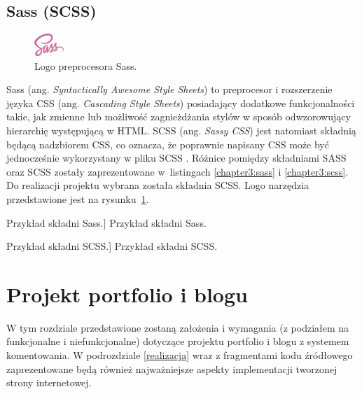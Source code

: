 \documentclass[a4paper, 12pt, twoside]{article}
\numberwithin{figure}{section}
\begin{document}
\begin{sloppypar}

\subsection*{Sass (SCSS)}

\begin{figure}[H] 
    \centering
        \includegraphics[width=0.1\textwidth]{images/sass-logo.png}
   \caption{Logo preprocesora Sass.}
   \label{fig:sass-logo.png}
\end{figure}

Sass (ang. \textit{Syntactically Awesome Style Sheets}) to preprocesor i rozszerzenie języka CSS (ang. \textit{Cascading Style Sheets}) posiadający dodatkowe funkcjonalności takie, jak zmienne lub możliwość zagnieżdżania stylów w sposób odwzorowujący hierarchię występującą w HTML. SCSS (ang. \textit{Sassy CSS}) jest natomiast składnią będącą nadzbiorem CSS, co oznacza, że poprawnie napisany CSS może być jednocześnie wykorzystany w pliku SCSS \cite{sass}. Różnice pomiędzy składniami SASS oraz SCSS zostały zaprezentowane w~listingach \ref{chapter3:sass} i \ref{chapter3:scss}. Do realizacji projektu wybrana została składnia SCSS. Logo narzędzia przedstawione jest na rysunku~\ref{fig:sass-logo.png}.
\newline
\begin{code}[htbp]
    
    \caption
    [Przykład składni Sass.]
    {Przykład składni Sass.}
    \label{chapter3:sass}
\end{code}

\begin{code}[htbp]
    
    \caption
    [Przykład składni SCSS.]
    {Przykład składni SCSS.}
    \label{chapter3:scss}
\end{code}


\clearpage

\section{Projekt portfolio i blogu} \label{wymagania}
W tym rozdziale przedstawione zostaną założenia i wymagania (z podziałem na funkcjonalne i niefunkcjonalne) dotyczące projektu portfolio i blogu z systemem komentowania. W podrozdziale \ref{realizacja} wraz z fragmentami kodu źródłowego zaprezentowane będą również najważniejsze aspekty implementacji tworzonej strony internetowej.
 

\end{sloppypar}
\end{document}
